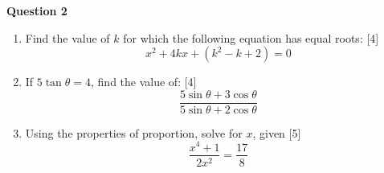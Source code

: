 \newpage
\par
\noindent
\textbf{Question 2}\\
\begin{enumerate}[label=(\roman*)]

    \item Find the value of $k$ for which the following 
        equation has equal roots: \hfill [4]
        \[
            x^2 + 4kx + (k^2 - k + 2) = 0
        \]

    \item If $5 \tan \theta = 4$, find the value of: \hfill [4]
        \[
            \frac{5 \sin \theta + 3 \cos \theta}{5 \sin \theta + 2 \cos \theta}
        \]

    \item Using the properties of proportion, solve for $x$, given \hfill [5]
        \[
            \frac{x^4 + 1}{2x^2} = \frac{17}{8}
        \]

\end{enumerate}
